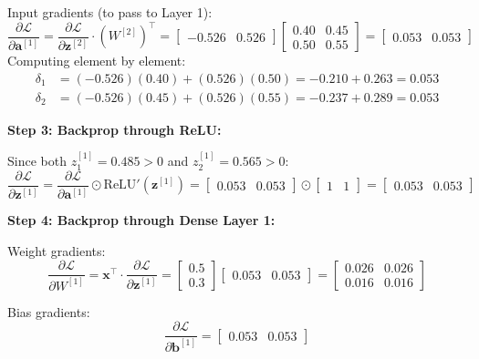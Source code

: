 \documentclass[12pt, a4paper]{report}
\theoremstyle{definition}
\begin{document}
Input gradients (to pass to Layer 1):
\[
\frac{\partial \mathcal{L}}{\partial \mathbf{a}^{[1]}} = \frac{\partial \mathcal{L}}{\partial \mathbf{z}^{[2]}} \cdot (W^{[2]})^\top = \begin{bmatrix} -0.526 & 0.526 \end{bmatrix} \begin{bmatrix} 0.40 & 0.45 \\ 0.50 & 0.55 \end{bmatrix} = \begin{bmatrix} 0.053 & 0.053 \end{bmatrix}
\]
Computing element by element:
\begin{align*}
    \delta_1 &= (-0.526)(0.40) + (0.526)(0.50) = -0.210 + 0.263 = 0.053 \\
    \delta_2 &= (-0.526)(0.45) + (0.526)(0.55) = -0.237 + 0.289 = 0.053
\end{align*}

\textbf{Step 3: Backprop through ReLU:}

Since both $z_1^{[1]} = 0.485 > 0$ and $z_2^{[1]} = 0.565 > 0$:
\[
\frac{\partial \mathcal{L}}{\partial \mathbf{z}^{[1]}} = \frac{\partial \mathcal{L}}{\partial \mathbf{a}^{[1]}} \odot \text{ReLU}'(\mathbf{z}^{[1]}) = \begin{bmatrix} 0.053 & 0.053 \end{bmatrix} \odot \begin{bmatrix} 1 & 1 \end{bmatrix} = \begin{bmatrix} 0.053 & 0.053 \end{bmatrix}
\]

\textbf{Step 4: Backprop through Dense Layer 1:}

Weight gradients:
\[
\frac{\partial \mathcal{L}}{\partial W^{[1]}} = \mathbf{x}^\top \cdot \frac{\partial \mathcal{L}}{\partial \mathbf{z}^{[1]}} = \begin{bmatrix} 0.5 \\ 0.3 \end{bmatrix} \begin{bmatrix} 0.053 & 0.053 \end{bmatrix} = \begin{bmatrix} 0.026 & 0.026 \\ 0.016 & 0.016 \end{bmatrix}
\]

Bias gradients:
\[
\frac{\partial \mathcal{L}}{\partial \mathbf{b}^{[1]}} = \begin{bmatrix} 0.053 & 0.053 \end{bmatrix}
\]
\end{document}
